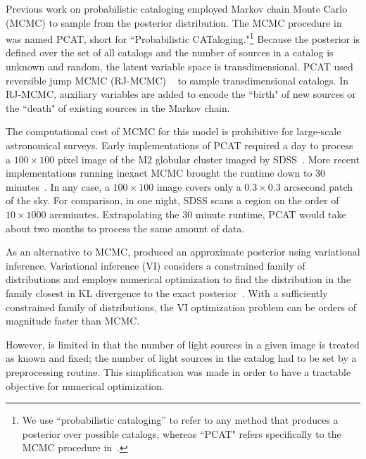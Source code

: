 Previous work on probabilistic cataloging employed Markov chain Monte Carlo (MCMC) to sample from the posterior distribution.
The MCMC procedure in~\cite{Portillo_2017, Feder_2019}
was named PCAT, short for ``Probabilistic CATaloging."\footnote{
We use ``probabilistic cataloging'' to refer to any method that produces a posterior over possible catalogs, whereas ``PCAT" refers specifically to the MCMC procedure in~\cite{Portillo_2017, Feder_2019}. }
Because the posterior is defined over the set of all catalogs and the number of sources in a catalog is unknown and random, 
the latent variable space is transdimensional. PCAT
used reversible jump MCMC (RJ-MCMC) ~\cite{Green95reversiblejump} to sample transdimensional catalogs. In RJ-MCMC, auxiliary variables are added to encode the ``birth" of new sources 
or the ``death" of existing sources in the Markov chain.

The computational cost of MCMC for this model is prohibitive for large-scale astronomical surveys. 
Early implementations of PCAT required a day to process a $100\times 100$ pixel image of the M2 globular cluster imaged by SDSS~\cite{Portillo_2017}. 
More recent implementations running inexact MCMC brought the runtime down to 30  minutes~\cite{Feder_2019}.  
In any case, a $100\times 100$ image covers only a $0.3\times0.3$ arcsecond patch of the sky.
For comparison, in one night, SDSS scans a region on the order of $10 \times 1000$ arcminutes. 
Extrapolating the 30 minute runtime, PCAT would take about two months to process the same amount of data.

As an alternative to MCMC, \cite{regier2019_celeste} produced an approximate posterior using variational inference.
Variational inference (VI) considers a constrained family of distributions and employs numerical optimization to find the distribution in the family closest
in KL divergence to the exact posterior~\cite{Blei_2017_vi_review,Jordan_intro_vi, Wainwrite_graph_models_vi}. 
With a sufficiently constrained family of distributions, the VI optimization problem can be orders of magnitude faster than MCMC. 

However, \cite{regier2019_celeste} is limited in that the number of light sources in a given image is treated as known and fixed; the number of light sources in the catalog had to be set by a preprocessing routine. 
This simplification was made in order to have a tractable objective for numerical optimization. 

\bigbreak



